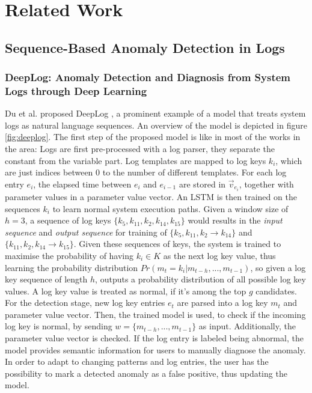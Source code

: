 \chapter{Related Work\label{cha:related_work}}


\section{Sequence-Based Anomaly Detection in Logs}

\subsection{DeepLog: Anomaly Detection and Diagnosis from System Logs through Deep Learning}
Du et al. proposed DeepLog \cite{du2017deeplog}, a prominent example of a model that treats system logs as natural language sequences. An overview of the model is depicted in figure \ref{fig:deeplog}. The first step of the proposed model is like in most of the works in the area: Logs are first pre-processed with a log parser, they separate the constant from the variable part. Log templates are mapped to log keys $k_i$, which are just indices between $0$ to the number of different templates. For each log entry $e_i$, the elapsed time between $e_i$ and $e_{i-1}$ are stored in $\vec{v}_{e_i}$, together with parameter values in a parameter value vector. An LSTM is then trained on the sequences $k_i$ to learn normal system execution paths. Given a window size of $h=3$, a sequence of log keys $\{k_5, k_{11}, k_2, k_{14}, k_{15}\}$ would results in the \textit{input sequence} and \textit{output sequence} for training of $\{k_{5},k_{11},k_{2} \rightarrow k_{14}\}$ and $\{k_{11},k_{2},k_{14} \rightarrow k_{15}\}$. Given these sequences of keys, the system is trained to maximise the probability of having $k_i \in K$ as the next log key value, thus learning the probability distribution $Pr(m_t = k_i | m_{t-h},...,m_{t-1})$, so given a log key sequence of length $h$, outputs a probability distribution of all possible log key values. A log key value is treated as normal, if it's among the top $g$ candidates.
 For the detection stage, new log key entries $e_t$ are parsed into a log key $m_t$ and parameter value vector. Then, the trained model is used, to check if the incoming log key is normal, by sending $w = \{m_{t-h}, ..., m_{t-1}\}$ as input. Additionally, the parameter value vector is checked. If the log entry is labeled being abnormal, the model provides semantic information for users to manually diagnose the anomaly. In order to adapt to changing patterns and log entries, the user has the possibility to mark a detected anomaly as a false positive, thus updating the model.

